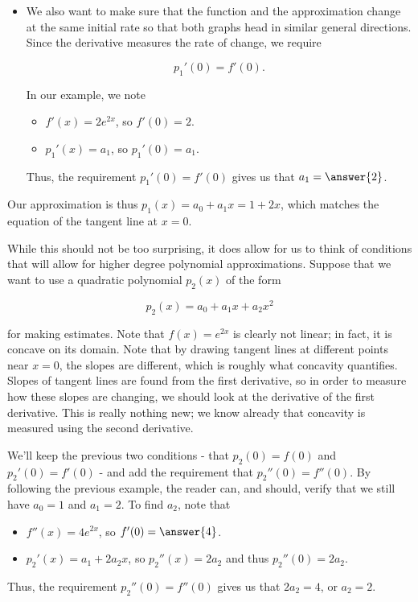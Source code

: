 \documentclass{ximera}
\begin{document}
\begin{model}
\begin{itemize}
\item We also want to make sure that the function and the approximation change at the same initial rate so that both graphs head in similar general directions.  Since the derivative measures the rate of change, we require

\[
p_1'(0) =f'(0).
\] 

In our example, we note

\begin{itemize}
\item $f'(x) = 2e^{2x}$, so $f'(0) = 2$.
\item $p_1'(x) = a_1$, so $p_1'(0) = a_1$.
\end{itemize}
Thus, the requirement $p_1'(0) =f'(0)$ gives us that $a_1=\answer{2}$.

\end{itemize}

Our approximation is thus $p_1(x) = a_0+a_1x = 1+2x$, which matches the equation of the tangent line at $x=0$.

While this should not be too surprising, it does allow for us to think of conditions that will allow for higher degree polynomial approximations.  Suppose that we want to use a quadratic polynomial $p_2(x)$ of the form

\[
p_2(x) = a_0+a_1x+a_2x^2
\]

for making estimates.  Note that $f(x)=e^{2x}$ is clearly not linear; in fact, it is concave  on its domain.  Note that by drawing tangent lines at different points near $x=0$, the slopes are different, which is roughly what concavity quantifies.  Slopes of tangent lines are found from the first derivative, so in order to measure how these slopes are changing, we should look at the derivative of the first derivative.  This is really nothing new; we know already that concavity is measured using the second derivative.

We'll keep the previous two conditions - that $p_2(0) = f(0)$ and $p_2'(0) = f'(0)$ - and add the requirement that $p_2''(0) = f''(0)$.  By following the previous example, the reader can, and should, verify that we still have $a_0=1$ and $a_1=2$.  To find $a_2$, note that

\begin{itemize}
\item $f''(x) = 4e^{2x}$, so $f'(0) = \answer{4}$.
\item $p_2'(x) = a_1+2a_2x$, so $p_2''(x) = 2a_2$ and thus $p_2''(0) = 2 a_2$.
\end{itemize}
Thus, the requirement $p_2''(0) =f''(0)$ gives us that $2a_2=4$, or $a_2=2$.


\end{model}
\end{document}
